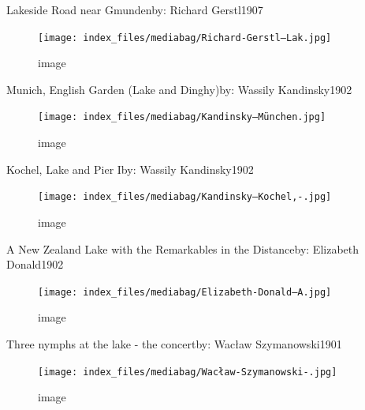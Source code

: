 \documentclass[
  a4paper,
]{book}
\begin{document}
\label{http:ux2fux2fwww.wikidata.orgux2fentityux2fQ28798149}
Lakeside Road near Gmundenby: Richard Gerstl1907

\begin{figure}[H]

{\centering \texttt{[image: index\_files/mediabag/Richard-Gerstl---Lak.jpg]}

}

\caption{image}

\end{figure}%

\label{http:ux2fux2fwww.wikidata.orgux2fentityux2fQ18705414}
Munich, English Garden (Lake and Dinghy)by: Wassily Kandinsky1902

\begin{figure}[H]

{\centering \texttt{[image: index\_files/mediabag/Kandinsky---München.jpg]}

}

\caption{image}

\end{figure}%

\label{http:ux2fux2fwww.wikidata.orgux2fentityux2fQ18705456}
Kochel, Lake and Pier Iby: Wassily Kandinsky1902

\begin{figure}[H]

{\centering \texttt{[image: index\_files/mediabag/Kandinsky---Kochel,-.jpg]}

}

\caption{image}

\end{figure}%

\label{http:ux2fux2fwww.wikidata.orgux2fentityux2fQ27876304}
A New Zealand Lake with the Remarkables in the Distanceby: Elizabeth
Donald1902

\begin{figure}[H]

{\centering \texttt{[image: index\_files/mediabag/Elizabeth-Donald---A.jpg]}

}

\caption{image}

\end{figure}%

\label{http:ux2fux2fwww.wikidata.orgux2fentityux2fQ24325535}
Three nymphs at the lake - the concertby: Wacław Szymanowski1901

\begin{figure}[H]

{\centering \texttt{[image: index\_files/mediabag/Wacław-Szymanowski-.jpg]}

}

\caption{image}

\end{figure}%
\end{document}
